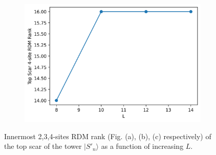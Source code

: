 \documentclass[11pt]{article}
\begin{document}
\begin{itemize}
\begin{itemize}
\begin{figure}[H]
\begin{subfigure}{0.45\textwidth}
        \includegraphics[width=\linewidth]{xy_scar_4p.png}
        \caption{}
        \label{fig:image3pxy}
    \end{subfigure}

    \caption{Innermost 2,3,4-sites RDM  rank (Fig. (a), (b), (c) respectively) of the top scar of the tower $|S'_n\rangle$ as a function of increasing $L$.}
    \label{fig:xy_scars_towerp}
\end{figure}

    \end{itemize}
    \end{itemize}
       
\vspace{0.3cm}
\end{document}
